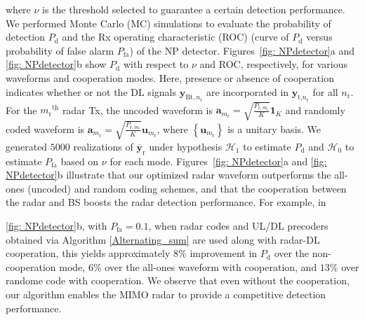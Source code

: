 \documentclass[10pt,journal]{IEEEtran}
\newcommand{\paren}[1]{\left({#1}\right)}
\newcommand{\braces}[1]{{\left\{ {#1}\right\}}}
\newcommand{\ith}[1]    {{#1}^{\underline{\text{th}}}}
\newcommand{\rr}{_\mathrm{r}}
\theoremstyle{definition}
\begin{document}
where $\nu$ is the threshold selected to guarantee a certain detection performance. We performed Monte Carlo (MC) simulations to evaluate the probability of detection $\mathit{P}_{\textrm{d}}$ and the Rx operating characteristic (ROC) (curve of $\mathit{P}_{\textrm{d}}$ versus probability of false alarm $\mathit{P}_{\textrm{fa}}$) of the NP detector. Figures~\ref{fig: NPdetector}a and \ref{fig: NPdetector}b show $\mathit{P}_{\textrm{d}}$ with respect to $\nu$ and ROC, %
respectively, for various waveforms and cooperation modes. Here, presence or absence of cooperation indicates whether or not the DL signals $\mathbf{y}_{\textrm{Bt},n\rr}$ are incorporated in $\mathbf{y}_{\textrm{t,}n\rr}$ for all $n\rr$. For the $\ith{m\rr}$ radar Tx, the uncoded waveform is $\mathbf{a}_{m\rr}=\sqrt{\frac{\mathit{P}_{\textrm{r},m\rr}}{\mathit{K}}}\mathbf{1}_{\mathit{K}}$ and randomly coded waveform is  $\mathbf{a}_{m\rr}=\sqrt{\frac{\mathit{P}_{\textrm{r},m\rr}}{\mathit{K}}}\mathbf{u}_{m\rr}$, where $\braces{\mathbf{u}_{m\rr}}$ is a unitary basis. We generated $5000$ realizations of $\overline{\mathbf{y}}_{\textrm{r}}$ under hypothesis $\mathcal{H}_1$ to estimate $\mathit{P}_{\textrm{d}}$ and $\mathcal{H}_0$ to estimate $\mathit{P}_{\textrm{fa}}$ based on $\nu$ for each mode. Figures~\ref{fig: NPdetector}a and \ref{fig: NPdetector}b illustrate that our optimized radar waveform outperforms the all-ones (uncoded) and random coding schemes, and that the cooperation between the radar and BS boosts the radar detection performance. For example, in \figurename{\;\ref{fig: NPdetector}b, with $P_{\textrm{fa}}=0.1$, when radar codes and UL/DL precoders obtained via Algorithm \ref{Alternating_sum} are used along with radar-DL cooperation, this yields approximately $8\%$ improvement in $P_{\textrm{d}}$ over the non-cooperation mode, $6\%$ over the all-ones waveform with cooperation, and $13\%$ over randome code with cooperation. We observe that even without the cooperation, our algorithm enables the MIMO radar to provide a competitive detection performance.

}
\end{document}
